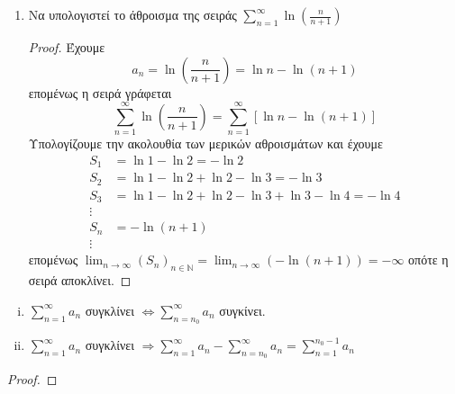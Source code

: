\documentclass[main.tex]{subfiles}
\begin{document}
\begin{examples}
\begin{enumerate}
        \item Να υπολογιστεί το άθροισμα της σειράς $ \sum_{n=1}^{\infty} 
            \ln{\left(\frac{n}{n+1}\right)} $
            \begin{proof}
                Έχουμε
                \[
                    a_{n} = \ln{\left(\frac{n}{n+1}\right)} = \ln{n} - \ln{(n+1)}  
                \]
                επομένως η σειρά γράφεται
                \[
                    \sum_{n=1}^{\infty} \ln{\left(\frac{n}{n+1} \right)} = 
                    \sum_{n=1}^{\infty} [ \ln{n} - \ln{(n+1)} ]
                \] 
                Υπολογίζουμε την ακολουθία των μερικών αθροισμάτων και έχουμε
                \begin{align*}
                    S_{1} &= \ln{1} - \ln{2} = - \ln{2}  \\
                    S_{2} &= \ln{1} - \ln{2} + \ln{2} - \ln{3} = - \ln{3}  \\
                    S_{3} &= \ln{1} - \ln{2} + \ln{2} - \ln{3} + \ln{3} - \ln{4} = - 
                    \ln{4}\\
                    \vdots \\
                    S_{n} &= - \ln{(n+1)} \\
                    \vdots
                \end{align*}
                επομένως $ \lim_{n \to \infty} {(S_{n})}_{n \in \mathbb{N}} = 
                \lim_{n \to \infty} (- \ln{(n+1)}) = - \infty $ οπότε η σειρά αποκλίνει.
            \end{proof}
    \end{enumerate}
\end{examples}




\begin{prop}\label{prop:diff}
\item {}
    \begin{enumerate}[i)]
        \item $ \sum_{n=1}^{\infty} a_{n}  $ συγκλίνει 
            $ \Leftrightarrow \sum_{n= n_{0}}^{\infty} a_{n}  $ συγκίνει.
        \item\label{prop:diff2} $ \sum_{n=1}^{\infty} a_{n}  $ συγκλίνει 
            $ \Rightarrow \sum_{n=1}^{\infty} a_{n} - \sum_{n= n_{0}}^{\infty} a_{n}  
            = \sum_{n=1}^{n_{0}-1} a_{n} $
    \end{enumerate}
\end{prop}
\begin{proof}

\end{proof}
\end{document}
